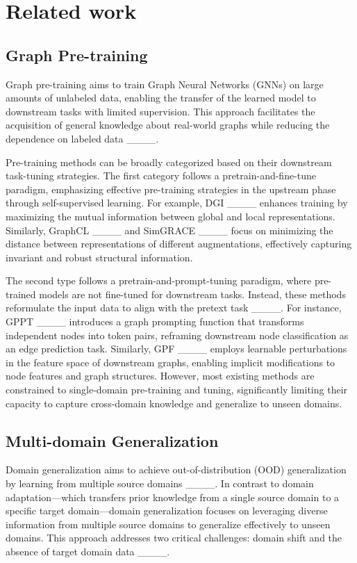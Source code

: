 \section{Related work}
\subsection{Graph Pre-training}

Graph pre-training aims to train Graph Neural Networks (GNNs) on large amounts of unlabeled data, enabling the transfer of the learned model to downstream tasks with limited supervision. This approach facilitates the acquisition of general knowledge about real-world graphs while reducing the dependence on labeled data ____.

Pre-training methods can be broadly categorized based on their downstream task-tuning strategies. The first category follows a pretrain-and-fine-tune paradigm, emphasizing effective pre-training strategies in the upstream phase through self-supervised learning. For example, DGI ____ enhances training by maximizing the mutual information between global and local representations. Similarly, GraphCL ____ and SimGRACE ____ focus on minimizing the distance between representations of different augmentations, effectively capturing invariant and robust structural information.

The second type follows a pretrain-and-prompt-tuning paradigm, where pre-trained models are not fine-tuned for downstream tasks. Instead, these methods reformulate the input data to align with the pretext task ____. For instance, GPPT ____ introduces a graph prompting function that transforms independent nodes into token pairs, reframing downstream node classification as an edge prediction task. Similarly, GPF ____ employs learnable perturbations in the feature space of downstream graphs, enabling implicit modifications to node features and graph structures. However, most existing methods are constrained to single-domain pre-training and tuning, significantly limiting their capacity to capture cross-domain knowledge and generalize to unseen domains.


\subsection{Multi-domain Generalization}

Domain generalization aims to achieve out-of-distribution (OOD) generalization by learning from multiple source domains ____. In contrast to domain adaptation—which transfers prior knowledge from a single source domain to a specific target domain—domain generalization focuses on leveraging diverse information from multiple source domains to generalize effectively to unseen domains. This approach addresses two critical challenges: domain shift and the absence of target domain data ____.

